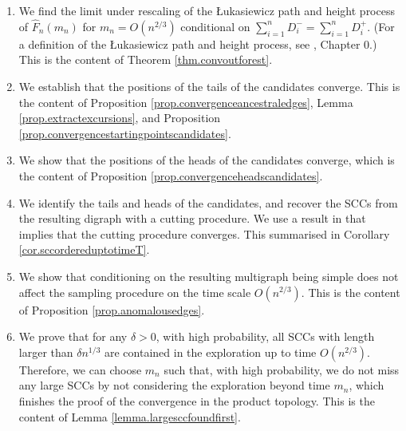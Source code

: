 \begin{enumerate}
    \item We find the limit under rescaling of the \L ukasiewicz path and height process of $\hat{F}_n(m_n)$ for $m_n=O(n^{2/3})$ conditional on $\sum_{i=1}^n D^-_i=\sum_{i=1}^n D^+_i$. (For a definition of the \L ukasiewicz path and height process, see \cite{AST_2002__281__R1_0}, Chapter 0.) This is the content of Theorem \ref{thm.convoutforest}. 
    \item We establish that the positions of the tails of the candidates converge. This is the content of Proposition \ref{prop.convergenceancestraledges}, Lemma \ref{prop.extractexcursions}, and Proposition \ref{prop.convergencestartingpointscandidates}.
    \item We show that the positions of the heads of the candidates converge, which is the content of Proposition \ref{prop.convergenceheadscandidates}. 
    \item We identify the tails and heads of the candidates, and recover the SCCs from the resulting digraph with a cutting procedure. We use a result in \cite{goldschmidtScalingLimitCritical2019} that implies that the cutting procedure converges. This summarised in Corollary \ref{cor.sccordereduptotimeT}.
    \item We show that conditioning on the resulting multigraph being simple does not affect the sampling procedure on the time scale $O(n^{2/3})$. This is the content of Proposition \ref{prop.anomalousedges}. 
    \item We prove that for any $\delta>0$, with high probability, all SCCs with length larger than $\delta n^{1/3}$ are contained in the exploration up to time $O(n^{2/3})$. Therefore, we can choose $m_n$ such that, with high probability, we do not miss any large SCCs by not considering the exploration beyond time $m_n$, which finishes the proof of the convergence in the product topology. This is the content of Lemma \ref{lemma.largesccfoundfirst}. 
\end{enumerate}


